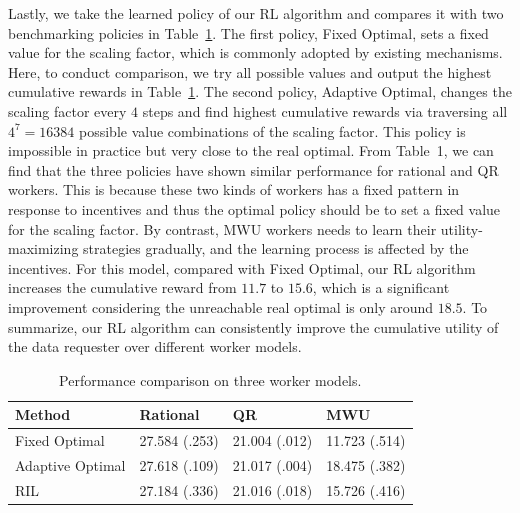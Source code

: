 %

%

Lastly, we take the learned policy of our RL algorithm and compares it with two benchmarking policies in Table~\ref{table:performance}. The first policy, Fixed Optimal, sets a fixed value for the scaling factor, which is commonly adopted by existing mechanisms. Here, to conduct comparison, we try all possible values and output the highest cumulative rewards in Table~\ref{table:performance}. The second policy, Adaptive Optimal, changes the scaling factor every $4$ steps and find highest cumulative rewards via traversing all $4^7=16384$ possible value combinations of the scaling factor. This policy is impossible in practice but very close to the real optimal.
From Table~1, we can find that the three policies have shown similar performance for rational and QR workers.
This is because these two kinds of workers has a fixed pattern in response to incentives and thus the optimal policy should be to set a fixed value for the scaling factor.
By contrast, MWU workers needs to learn their utility-maximizing strategies gradually, and the learning process is affected by the incentives.
For this model, compared with Fixed Optimal, our RL algorithm increases the cumulative reward from $11.7$ to $15.6$, which is a significant improvement considering the unreachable real optimal is only around $18.5$. To summarize, our RL algorithm can consistently improve the cumulative utility of the data requester over different worker models.

\begin{table}
\caption{
\label{table:performance}Performance comparison on three worker models.}
\centering
{\scriptsize
\begin{sc}
\begin{tabular}{ l | l | l | l }
\hline
Method & Rational & QR & MWU \\ \hline \hline
Fixed Optimal & 27.584 (.253) & 21.004 (.012) & 11.723 (.514) \\
Adaptive Optimal & 27.618 (.109) & 21.017 (.004) & 18.475 (.382) \\
RIL & 27.184 (.336) & 21.016 (.018) & 15.726 (.416)\\
\hline
\end{tabular}
\end{sc}
}
\vskip 0.1in
\end{table}




